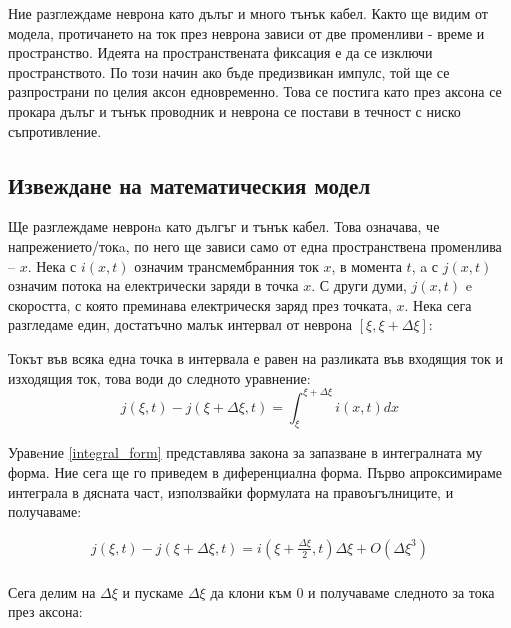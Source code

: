 \documentclass{article}
\numberwithin{equation}{section}
\begin{document}
        Ние разглеждаме неврона като дълъг и много тънък кабел. Както ще видим от модела, протичането на ток през неврона
        зависи от две променливи - време и пространство. Идеята на пространствената фиксация е да се изключи пространството.
        По този начин ако бъде предизвикан импулс, той ще се разпространи по целия аксон едновременно. Това се постига като
        през аксона се прокара дълъг и тънък проводник и неврона се постави в течност с ниско съпротивление.
    \subsection{Извеждане на математическия модел}
    Ще разглеждаме невронa като дългъг и тънък кабел. Това означава, че напрежението/токa, по него ще зависи само от една пространствена
    променлива -- $x$. Нека с $i\left(x, t\right)$ означим трансмембранния ток $x$, в момента $t$, a с $j\left(x, t\right)$ означим потока на електрически заряди в точка $x$. С други думи, $j\left(x, t\right)$ e
    скоростта, с която преминава електрическя заряд през точката, $x$. Нека сега разгледаме един, достатъчно малък интервал от неврона
    $\left[\xi, \xi+\Delta\xi\right]$:

    \begin{figure}[H]
        
        \caption{}
    \end{figure}

    Токът във всяка една точка в интервала е равен на разликата във входящия ток и изходящия ток, това води до следното уравнение:
    \begin{equation}\label{integral_form}
        j\left(\xi,t\right) - j\left(\xi + \Delta\xi, t\right) = \int_{\xi}^{\xi + \Delta\xi} i\left(x,t\right)dx
    \end{equation}

Уравeние \eqref{integral_form} представлява закона за запазване в интегралната му форма. Ние сега ще го приведем в диференциална форма.
Първо апроксимираме интеграла в дясната част, използвайки формулата на правоъгълниците, и получаваме:

    \begin{gather*} 
        j\left(\xi,t\right) - j\left(\xi + \Delta\xi, t\right) = i\left(\xi + \frac{\Delta\xi}{2},t\right)\Delta\xi +
        O\left(\Delta\xi^3\right)\\
     \end{gather*}

    Сега делим на $\Delta\xi$ и пускаме $\Delta\xi$ да клони към 0 и получаваме следното за тока през аксона:
     
\end{document}
